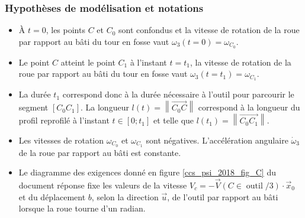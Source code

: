 \subsubsection*{Hypothèses de modélisation et notations}
\begin{itemize}
  \item À $t=0$, les points $C$ et $C_{0}$ sont confondus et la vitesse de rotation de la roue par rapport au bâti du tour en fosse vaut $\omega_{3}(t=0)=\omega_{C_{0}}$.
  \item Le point $C$ atteint le point $C_{1}$ à l'instant $t=t_{1}$, la vitesse de rotation de la roue par rapport au bâti du tour en fosse vaut $\omega_{3}\left(t=t_{1}\right)=\omega_{C_{1}}$.
  \item La durée $t_{1}$ correspond donc à la durée nécessaire à l'outil pour parcourir le segment $\left[C_{0} C_{1}\right]$. La longueur $l(t)=\left\|\overrightarrow{C_{0} C}\right\|$ correspond à la longueur du profil reprofilé à l'instant $t \in\left[0 ; t_{1}\right]$ et telle que $l\left(t_{1}\right)=\left\|\overrightarrow{C_{0} C_{1}}\right\|$.
  \item Les vitesses de rotation $\omega_{C_{0}}$ et $\omega_{C_{1}}$ sont négatives. L'accélération angulaire $\dot{\omega}_{3}$ de la roue par rapport au bâti est constante.
  \item Le diagramme des exigences donné en figure \ref{ccs_psi_2018_fig_C} du document réponse fixe les valeurs de la vitesse $V_{c}= -\vec{V}(C \in \operatorname{outil} / 3) \cdot \vec{x}_{0}$ et du déplacement $b$, selon la direction $\vec{u}$, de l'outil par rapport au bâti lorsque la roue tourne d'un radian.\\
\end{itemize}





